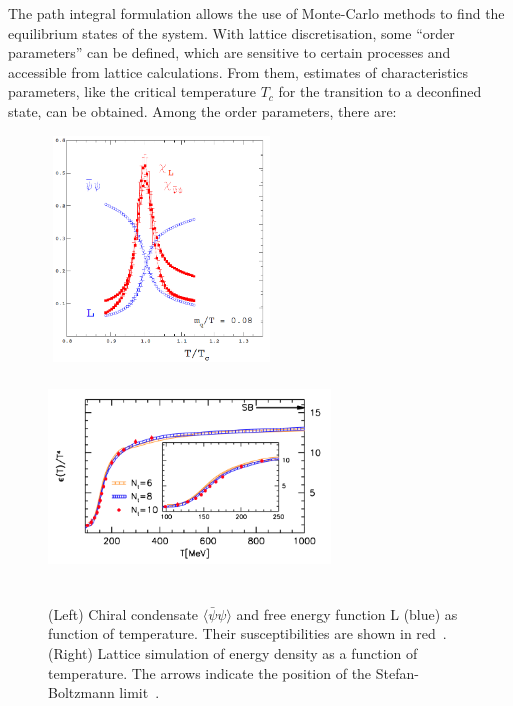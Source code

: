 The path integral 
formulation allows the use of Monte-Carlo methods to find the equilibrium states of the system. 
With lattice discretisation, some ``order parameters'' can be defined, which are 
sensitive to certain processes and accessible from lattice calculations. From them, 
estimates of characteristics parameters, like the critical temperature $T_c$ for the transition
to a deconfined state, can be obtained. Among the order parameters, there are:
\begin{figure}[!t]
\includegraphics[width=6cm,height=6cm]{FigCap1/Lattice1.png} 
\includegraphics[width=7.5cm,height=5.8cm]{FigCap1/BW_EnDensity.png}
 \caption{(Left) Chiral condensate $\langle \bar{\psi}\psi\rangle$ and free energy function L (blue) as function of temperature. Their susceptibilities are shown in red~\cite{Karsch:2001vs}. (Right) Lattice simulation of energy density as a function of temperature. The arrows indicate the position of the Stefan-Boltzmann limit~\cite{Borsanyi:2010cj}.}
\label{fig:Lattice}
\end{figure}

